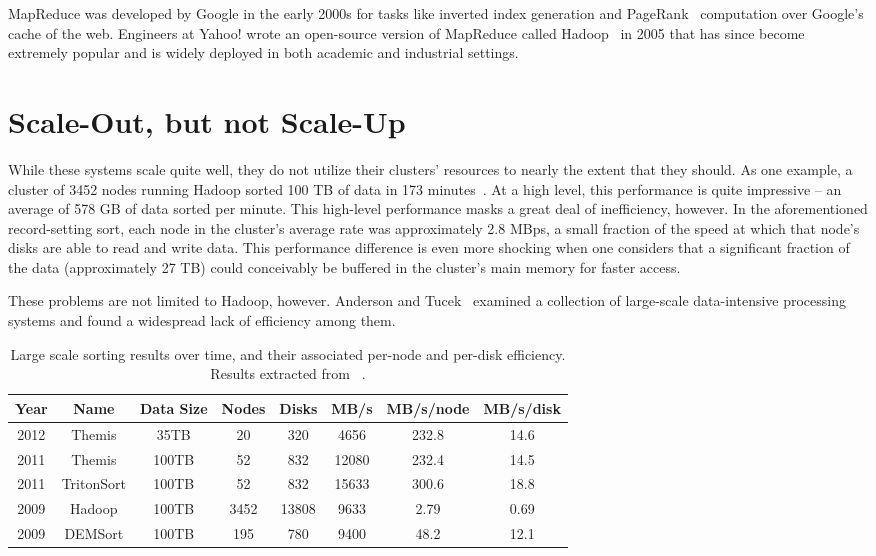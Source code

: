 MapReduce was developed by Google in the early 2000s for tasks like inverted
index generation and PageRank~\cite{pagerank} computation over Google's cache
of the web. Engineers at Yahoo! wrote an open-source version of MapReduce
called Hadoop~\cite{hadoop} in 2005 that has since become extremely popular and
is widely deployed in both academic and industrial settings.


\section{Scale-Out, but not Scale-Up}

While these systems scale quite well, they do not utilize their clusters'
resources to nearly the extent that they should. As one example, a cluster of
3452 nodes running Hadoop sorted 100 TB of data in 173
minutes~\cite{hadoop-sort-2009}. At a high level, this performance is quite
impressive -- an average of 578 GB of data sorted per minute. This high-level
performance masks a great deal of inefficiency, however. In the aforementioned
record-setting sort, each node in the cluster's average rate was approximately
2.8 MBps, a small fraction of the speed at which that node's disks are able to
read and write data. This performance difference is even more shocking when one
considers that a significant fraction of the data (approximately 27 TB) could
conceivably be buffered in the cluster's main memory for faster access.

These problems are not limited to Hadoop, however. Anderson and
Tucek~\cite{efficiency-matters} examined a collection of large-scale
data-intensive processing systems and found a widespread lack of efficiency
among them.

\begin{table}
\begin{tabular}{c|c|c|c|c|c|c|c}
\textbf{Year} & \textbf{Name} & \textbf{Data Size} & \textbf{Nodes} & \textbf{Disks} & \textbf{MB/s} & \textbf{MB/s/node} & \textbf{MB/s/disk}\\
\hline
2012 & Themis & 35TB & 20 & 320 & 4656 & 232.8 & 14.6 \\
2011 & Themis & 100TB & 52 & 832 & 12080 & 232.4 & 14.5 \\
2011 & TritonSort & 100TB & 52 & 832  & 15633 & 300.6 & 18.8 \\
2009 & Hadoop & 100TB & 3452 & 13808 & 9633 & 2.79 & 0.69 \\
2009 & DEMSort & 100TB & 195 & 780 & 9400 & 48.2 & 12.1
\end{tabular}
\caption{\label{table:system-efficiency} Large scale sorting results over time,
  and their associated per-node and per-disk efficiency. Results extracted from
  ~\cite{efficiency-matters, hadoop-sort-2009, themis, tritonsort}.}
\end{table}

